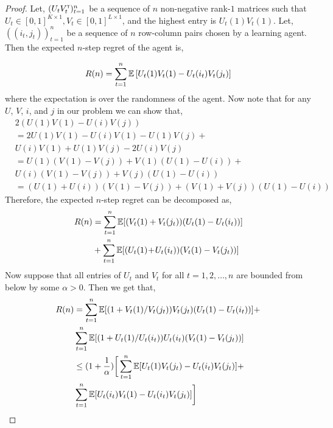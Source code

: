 \begin{proof}
Let, $(U_t V_t^\mathsf{\scriptscriptstyle T})_{t = 1}^n$ be a sequence of $n$ non-negative rank-$1$  matrices such that $U_t \in [0, 1]^{K \times 1}, V_t \in [0, 1]^{L \times 1}$, and the highest entry is $U_t(1) V_t(1)$. Let, $((i_t, j_t))_{t = 1}^n$
be a sequence of $n$ row-column pairs chosen by a learning agent. Then the expected $n$-step regret of the agent is,


\begin{align*}
R(n) = \sum_{t = 1}^n \mathbb{E} \left[{U_t(1) V_t(1) - U_t(i_t) V_t(j_t)}\right]
\end{align*}
where the expectation is over the randomness of the agent. Now note that for any $U$, $V$, $i$, and $j$ in our problem we can show that,
\begin{align*}
& 2 (U(1) V(1) - U(i) V(j)) \\
 & =   2 U(1) V(1)  -  U(i) V(1) -  U(1) V(j) + \\
&     U(i) V(1) + U(1) V(j)  -  2 U(i) V(j) \\
& = U(1) (V(1) - V(j))  + V(1) (U(1) -  U(i))  +\\
&  U(i) (V(1)  - V(j))  + V(j) (U(1)  - U(i)) \\
& = \left(U(1) \!+\! U(i)\right) \left(V(1) \! - \! V(j)\right) \! +\! \left(V(1) \! + \! V(j)\right) \left(U(1) \! - \! U(i)\right)
\end{align*}
Therefore, the expected $n$-step regret can be decomposed as,
\begin{align*}
R(n) &= \sum_{t = 1}^n \mathbb{E}[{(V_t(1) + V_t(j_t)) (U_t(1) - U_t(i_t))}] \\
&+ \sum_{t = 1}^n \mathbb{E}[{(U_t(1) \! + \! U_t(i_t)) (V_t(1) - V_t(j_t))}]
\end{align*}
Now suppose that all entries of $U_t$ and $V_t$ for all $t=1,2,\ldots, n$ are bounded from below by some $\alpha > 0$. Then we get that,
\begin{align*}
R(n)
& = \sum_{t = 1}^n \mathbb{E}[{(1 + V_t(1) / V_t(j_t)) V_t(j_t) (U_t(1) - U_t(i_t))}] +\\
&\sum_{t = 1}^n \mathbb{E}[{(1 + U_t(1) / U_t(i_t)) U_t(i_t) (V_t(1) - V_t(j_t))}] \\
& \leq (1 + \frac{1}{\alpha}) \bigg[\sum_{t = 1}^n \mathbb{E}[{U_t(1) V_t(j_t) - U_t(i_t) V_t(j_t)}] + \\
& \sum_{t = 1}^n \mathbb{E}[{U_t(i_t) V_t(1) - U_t(i_t) V_t(j_t)}]\bigg]
\end{align*}


\end{proof}
